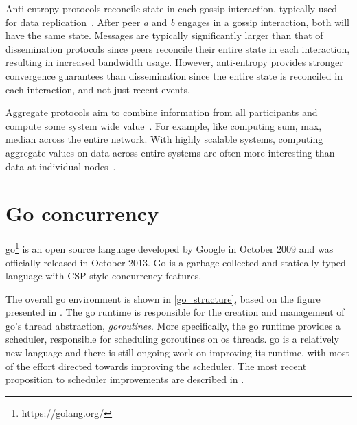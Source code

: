 \documentclass[USenglish]{uit-thesis}
\begin{document}
Anti-entropy protocols reconcile state in each gossip interaction, typically used for data replication~\cite{gossip_promise}.
After peer \textit{a} and \textit{b} engages in a gossip interaction, both will have the same state.
Messages are typically significantly larger than that of dissemination protocols since peers reconcile their entire state in each interaction, resulting in increased bandwidth usage.
However, anti-entropy provides stronger convergence guarantees than dissemination since the entire state is reconciled in each interaction, and not just recent events.

Aggregate protocols aim to combine information from all participants and compute some system wide value~\cite{gossip_promise}.
For example, like computing sum, max, median across the entire network.
With highly scalable systems, computing aggregate values on data across entire systems are often more interesting than data at individual nodes~\cite{tag, agggossip, astrolabe}.




  
 


\iffalse
\section{Go concurrency}
\gls{go}\footnote{https://golang.org/} is an open source language developed by Google in October 2009 and was officially released in October 2013.
Go is a garbage collected and statically typed language with CSP-style concurrency features.

The overall \gls{go} environment is shown in \autoref{go_structure}, based on the figure presented in \cite{go_scheduler}.
The \gls{go} runtime is responsible for the creation and management of \gls{go}'s thread abstraction, \textit{goroutines}.
More specifically, the \gls{go} runtime provides a scheduler, responsible for scheduling goroutines on \gls{os} threads. 
\gls{go} is a relatively new language and there is still ongoing work on improving its runtime, with most of the effort directed towards improving the scheduler.
The most recent proposition to scheduler improvements are described in \cite{go_scheduler}.
\end{document}
